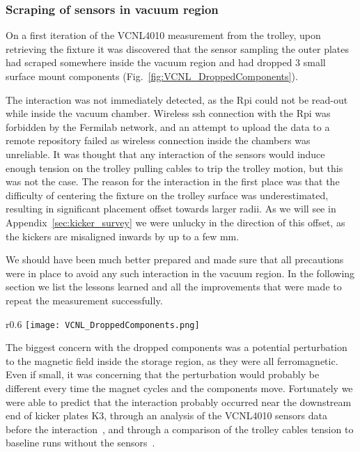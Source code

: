 

\subsubsection{\label{sec:VCNL_interaction_kickers} Scraping of sensors in vacuum region}


On a first iteration of the VCNL4010 measurement from the trolley, upon retrieving the fixture it was discovered that the sensor sampling the outer plates had scraped somewhere inside the vacuum region and had dropped 3 small surface mount components (Fig.~\ref{fig:VCNL_DroppedComponents}).


The interaction was not immediately detected, as the Rpi could not be read-out while inside the vacuum chamber. 
Wireless ssh connection with the Rpi was forbidden by the Fermilab network, and an attempt to upload the data to a remote repository failed as wireless connection inside the chambers was unreliable. 
It was thought that any interaction of the sensors would induce enough tension on the trolley pulling cables to trip the trolley motion, but this was not the case. 
The reason for the interaction in the first place was that the difficulty of centering the fixture on the trolley surface was underestimated, resulting in significant placement offset towards larger radii.
As we will see in Appendix~\ref{sec:kicker_survey} we were unlucky in the direction of this offset, as the kickers are misaligned inwards by up to a few mm.

We should have been much better prepared and made sure that all precautions were in place to avoid any such interaction in the vacuum region.
In the following section we list the lessons learned and all the improvements that were made to repeat the measurement successfully.



\begin{wrapfigure}{r}{0.6\textwidth}
	\centering
	\texttt{[image: VCNL\_DroppedComponents.png]}
	\caption{The VCNL4010 chip after interaction. Surface mount components scraped and dropped inside the vacuum chambers. 
	}\label{fig:VCNL_DroppedComponents}
\end{wrapfigure}


The biggest concern with the dropped components was a potential perturbation to the magnetic field inside the storage region, as they were all ferromagnetic. 
Even if small, it was concerning that the perturbation would probably be different every time the magnet cycles and the components move. 
Fortunately we were able to predict that the interaction probably occurred near the downstream end of kicker plates K3, through an analysis of the VCNL4010 sensors data before the interaction~\cite{Kargiantoulakis:doc14547}, and through a comparison of the trolley cables tension to baseline runs without the sensors~\cite{Kargiantoulakis:doc14938}.





